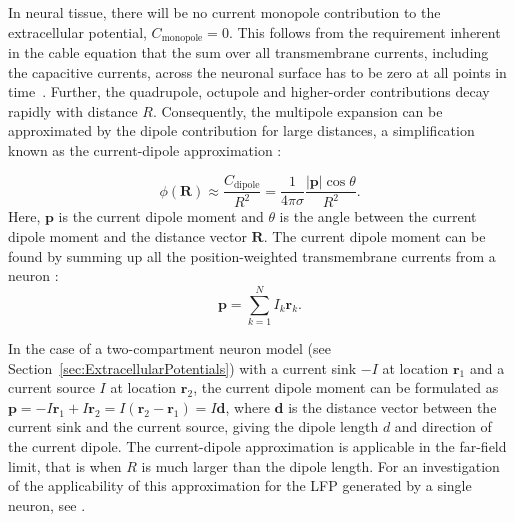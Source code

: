 \documentclass[preprint,11pt,authoryear]{elsarticle}
\newcommand{\hlR}[2][red]{ {\sethlcolor{#1} \hl{#2}} }
\newcommand{\hlp}[2][Purple]{ {\sethlcolor{#1} \hl{#2}} }
\newcommand{\gen}[1]{\color{white}{\hlR{GTE: #1 }}\color{black}}
\newcommand{\snnote}[1]{\color{white}{\hlp{SN: #1 }}\color{black}}
\begin{document}
In neural tissue, there will be no current monopole contribution to the extracellular potential,  
$C_\text{monopole}=0$. This follows from the requirement inherent in the cable equation that the sum over all transmembrane currents, including the capacitive currents, across the neuronal surface has to be zero at all points in time~\citep{Pettersen2012}.
Further,
the quadrupole, octupole and higher-order contributions decay rapidly with distance $R$. Consequently, the multipole expansion can be approximated by the dipole contribution for large distances, a simplification known as the current-dipole approximation \citep{Nunez2006}:

\begin{equation}\label{eq:CDA}
\phi(\mathbf{R}) \approx \frac{C_\text{dipole}}{R^2} = \frac{1}{4 \pi \sigma} \frac{|\mathbf{p}| \cos \theta}{R^2}.
\end{equation}
Here, $\mathbf{p}$ is the current dipole moment and $\theta$ is the angle between the current dipole moment and the distance vector $\mathbf{R}$. The current dipole moment can be found by summing up all the position-weighted transmembrane currents from a neuron \citep{Pettersen2008, Pettersen2014, Nunez2006}: 
\begin{equation}\label{eq:dipole}
\mathbf{p} = \sum_{k=1}^N I_k \mathbf{r}_k.
\end{equation}

In the case of a two-compartment neuron model (see Section~\ref{sec:ExtracellularPotentials}) with a current sink $-I$ at location $\mathbf{r}_1$ and a current source $I$ at location $\mathbf{r}_2$, the current dipole moment can be formulated as $\mathbf{p} = -I\mathbf{r}_1 + I\mathbf{r}_2 = I(\mathbf{r}_2 - \mathbf{r}_1) = I\mathbf{d}$, where $\mathbf{d}$ is the distance vector between the current sink and the current source, giving the dipole length $d$ and direction of the current dipole. The current-dipole approximation is applicable in the far-field limit, that is when $R$ is much larger than the dipole length. For an investigation of the applicability of this approximation for the LFP generated by a single neuron, 
see \cite{Linden2010}.

\
\end{document}
